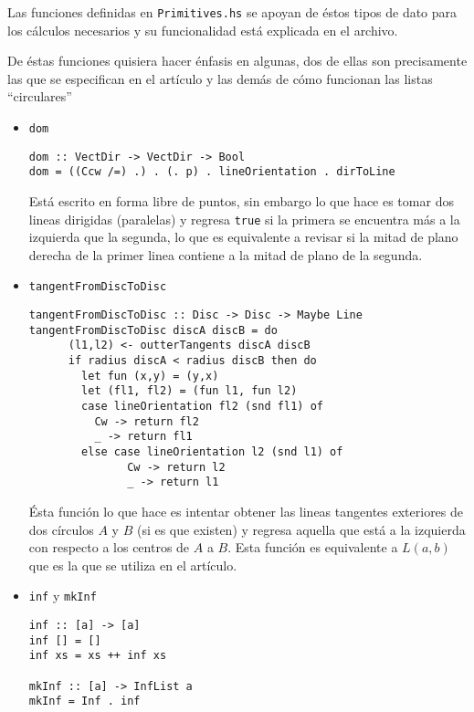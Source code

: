 \documentclass[12pt]{article}
\begin{document}
Las funciones definidas en \texttt{Primitives.hs} se apoyan de éstos tipos de dato para los cálculos necesarios y su funcionalidad está explicada en el archivo.

De éstas funciones quisiera hacer énfasis en algunas, dos de ellas son precisamente las que se especifican en el artículo y las demás de cómo funcionan las listas ``circulares''

\begin{itemize}
\item \texttt{dom}

  \begin{verbatim}
dom :: VectDir -> VectDir -> Bool
dom = ((Ccw /=) .) . (. p) . lineOrientation . dirToLine
  \end{verbatim}

  Está escrito en forma libre de puntos, sin embargo lo que hace es tomar dos lineas dirigidas (paralelas) y regresa \texttt{true} si la primera se encuentra más a la izquierda que la segunda, lo que es equivalente a revisar si la mitad de plano derecha de la primer linea contiene a la mitad de plano de la segunda.

\item \texttt{tangentFromDiscToDisc}

  \begin{verbatim}
tangentFromDiscToDisc :: Disc -> Disc -> Maybe Line
tangentFromDiscToDisc discA discB = do
      (l1,l2) <- outterTangents discA discB
      if radius discA < radius discB then do
        let fun (x,y) = (y,x)
        let (fl1, fl2) = (fun l1, fun l2)
        case lineOrientation fl2 (snd fl1) of
          Cw -> return fl2
          _ -> return fl1
        else case lineOrientation l2 (snd l1) of
               Cw -> return l2
               _ -> return l1
  \end{verbatim}

  Ésta función lo que hace es intentar obtener las lineas tangentes exteriores de dos círculos $A$ y $B$ (si es que existen) y regresa aquella que está a la izquierda con respecto a los centros de $A$ a $B$. Esta función es equivalente a $L(a,b)$ que es la que se utiliza en el artículo.

\item \texttt{inf} y \texttt{mkInf}

  \begin{verbatim}
inf :: [a] -> [a]
inf [] = []
inf xs = xs ++ inf xs

mkInf :: [a] -> InfList a
mkInf = Inf . inf    
  \end{verbatim}


\end{itemize}
\end{document}
